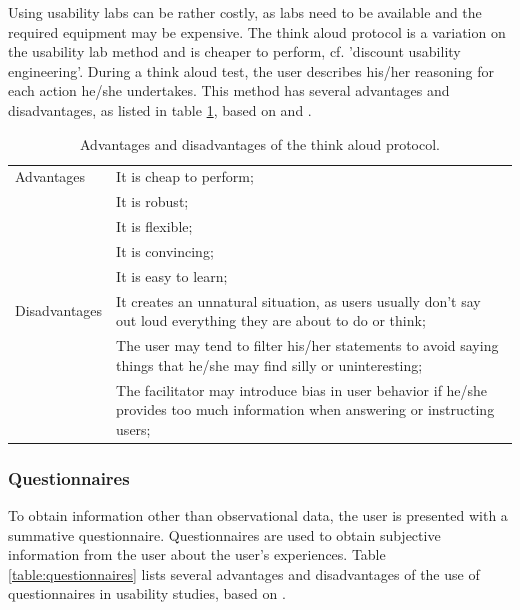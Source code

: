 Using usability labs can be rather costly, as labs need to be available and the required equipment may be expensive. The think aloud protocol is a variation on the usability lab method and is cheaper to perform, cf. 'discount usability engineering'\cite{duval:2012:chi:evaluation}. During a think aloud test, the user describes his/her reasoning for each action he/she undertakes\cite{nielsen:2012:nngroup:think_aloud}. This method has several advantages and disadvantages, as listed in table \ref{table:usability_engineering}, based on \cite{nielsen:2012:nngroup:think_aloud} and \cite{snyder:2003}.


\begin{table}%
	\begin{center}
		\begin{tabular}{l p{300px}}
			\hline
			Advantages		&		It is cheap to perform; \\
										&		It is robust; \\
										&		It is flexible; \\
										&		It is convincing; \\
										&		It is easy to learn; \\
			\hline
			Disadvantages	&		It creates an unnatural situation, as users usually don't say out loud everything they are about to do or think; \\
										&		The user may tend to filter his/her statements to avoid saying things that he/she may find silly or uninteresting; \\
										&		The facilitator may introduce bias in user behavior if he/she provides too much information when answering or instructing users; \\
			\hline
		\end{tabular}
	\end{center}
	\caption{Advantages and disadvantages of the think aloud protocol.}
	\label{table:usability_engineering}
\end{table}

\subsubsection{Questionnaires}

To obtain information other than observational data, the user is presented with a summative questionnaire. Questionnaires are used to obtain subjective information from the user about the user's experiences. Table \ref{table:questionnaires} lists several advantages and disadvantages of the use of questionnaires in usability studies, based on \cite{kirakowski:2013}.

